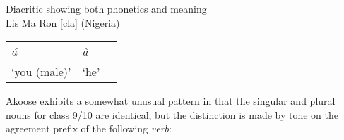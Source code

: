 \documentclass[output=paper]{langscibook}
\begin{document}
\ea Diacritic showing both phonetics and meaning\label{tab:DiacriticPhoneticsMeaning:10}\\
Lis Ma Ron [cla] (Nigeria) \citep{Harley2012}\smallskip\\
\begin{tabularx}{\linewidth}{@{}XXX@{}}
\textit{á} &  \textit{à} & \\
‘you (male)’ & `he'      & \\
\end{tabularx}
\z 
    
    Akoose exhibits a somewhat unusual pattern in that the singular and plural nouns for class 9/10 are identical, but the distinction is made by tone on the agreement prefix of the following \textit{verb}: 

    
\end{document}
